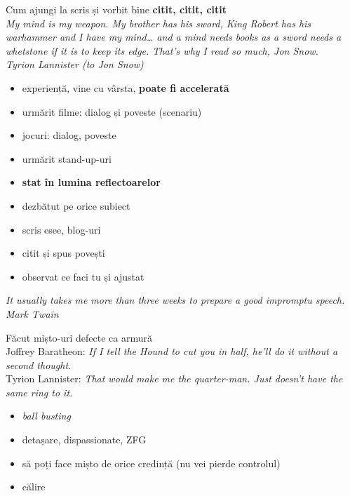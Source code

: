 \documentclass{beamer}
\begin{document}
\begin{frame}{Cum ajungi la scris și vorbit bine}
  \centering
  \pause
  \textbf{citit, citit, citit}\\
  \vspace{3mm}
  \scriptsize
  \pause
  \textit{My mind is my weapon. My brother has his sword, King Robert has his warhammer and I have my mind\ldots{} and a mind needs books as a sword needs a whetstone if it is to keep its edge. That's why I read so much, Jon Snow.}\\
  \vspace{3mm}
  \hfill \textit{Tyrion Lannister (to Jon Snow)}
  \vspace{3mm}
  \begin{itemize}
    \pause
  \item experiență, vine cu vârsta, \textbf{poate fi accelerată}
    \pause
    \item urmărit filme: dialog și poveste (scenariu)
    \pause
    \item jocuri: dialog, poveste
    \pause
    \item urmărit stand-up-uri
    \pause
    \item \textbf{stat în lumina reflectoarelor}
    \pause
    \item dezbătut pe orice subiect
    \pause
    \item scris esee, blog-uri
    \pause
    \item citit și spus povești
    \pause
    \item observat ce faci tu și ajustat
  \end{itemize}
  \centering
  \vspace{3mm}
  \pause
  \textit{It usually takes me more than three weeks to prepare a good impromptu speech.}\\
  \vspace{3mm}
  \hfill \textit{Mark Twain}
\end{frame}

\begin{frame}{Făcut mișto-uri}
  \pause
  defecte ca armură\\
  \scriptsize
  \vspace{3mm}
  \pause
  \qquad Joffrey Baratheon: \textit{If I tell the Hound to cut you in half, he'll do it without a second thought.}\\
  \qquad Tyrion Lannister: \textit{That would make me the quarter-man. Just doesn't have the same ring to it.}\\
  \vspace{3mm}
  \normalsize
  \begin{itemize}
    \pause
    \item \textit{ball busting}
    \pause
    \item detașare, dispassionate, ZFG
    \pause
    \item să poți face mișto de orice credință (nu vei pierde controlul)
    \pause
    \item călire
  \end{itemize}
\end{frame}
\end{document}
